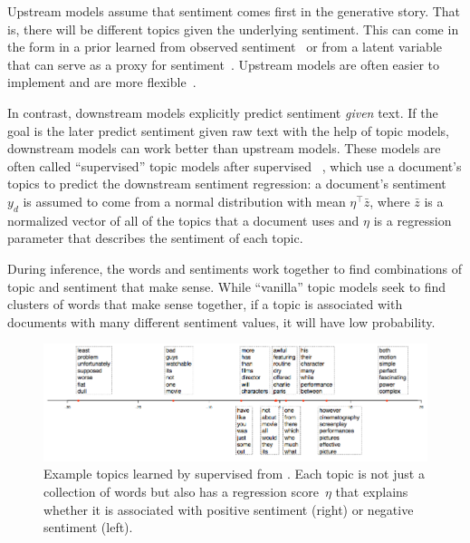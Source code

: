 
Upstream models assume that sentiment comes first in the generative
story.  That is, there will be different topics given the underlying
sentiment.  This can come in the form in a prior learned from observed
sentiment~\citep{mimno-08} or from a latent variable that can serve as
a proxy for sentiment~\citep{lin-09}.  Upstream models are often
easier to implement and are more flexible~\citep{stewart-14}.

In contrast, downstream models explicitly predict sentiment
\emph{given} text.  If the goal is the later predict sentiment given
raw text with the help of topic models, downstream models can work
better than upstream models.  These models are often called
``supervised'' topic models after supervised
~\citep{blei-07b}, which use a document's topics to predict
the downstream sentiment regression: a document's sentiment~$y_d$ is
assumed to come from a normal distribution with mean $\eta^\top \bar
z$, where $\bar z$ is a normalized vector of all of the topics that a
document uses and $\eta$ is a regression parameter that describes the
sentiment of each topic.

During inference, the words and sentiments work together to find
combinations of topic and sentiment that make sense.  While
``vanilla'' topic models seek to find clusters of words that make
sense together, if a topic is associated with documents with many
different sentiment values, it will have low probability.  

\begin{figure}
  \begin{center}
    \includegraphics[width=1.0\linewidth]{figures/slda}
  \end{center}
  \caption{Example topics learned by supervised  from
    \citet{blei-07b}.  Each topic is not just a collection of words
    but also has a regression score~$\eta$ that explains whether it is
    associated with positive sentiment (right) or negative sentiment
    (left).}
  \label{fig:slda-topics}
\end{figure}

